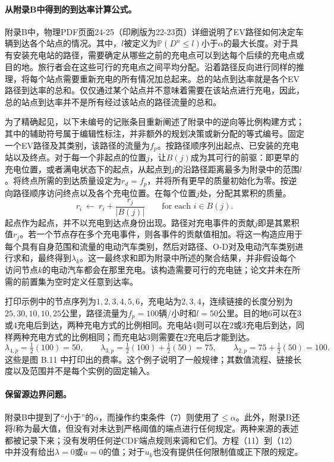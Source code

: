 \documentclass{article}
\begin{document}
\paragraph{从附录B中得到的到达率计算公式。}
附录B中，物理PDF页面24-25（印刷版为22-23页）详细说明了EV路径如何决定车辆到达各个站点的情况。其中，$l$被定义为$\mathbb P(D^n\leq l)$小于$\alpha$的最大长度。对于具有安装充电站的路径，需要确定从哪些之前的充电点可以到达每个后续的充电点或目的地。旅行者会在这些可行的充电点之间平均分配。沿着路径反向进行同样的推理，将每个站点需要重新充电的所有情况加总起来。总的站点到达率就是各个EV路径到达率的总和。仅仅通过某个站点并不意味着需要在该站点进行充电，因此，总的站点到达率并不是所有经过该站点的路径流量的总和。

为了精确起见，以下未编号的记账条目重新阐述了附录中的逆向等比例构建方式；其中的辅助符号属于编辑性标注，并非额外的规划决策或新分配的等式编号。固定一个EV路径及其类别，该路径的流量为$f_p$。按路径顺序列出起点、已安装的充电站以及终点。对于每一个非起点的位置$j$，让$B(j)$成为其可行的前驱：即更早的充电位置，或者满电状态下的起点，从起点到$j$的沿路径距离最多为附录中的范围$l$。将终点所需的到达质量设定为$r_d=f_p$，并将所有更早的质量初始化为零。按逆向路径顺序访问终点以及各个充电位置。在每个位置$j$处，分配其累积的质量。
\[
 r_i\ \leftarrow\ r_i+\frac{r_j}{|B(j)|}
 \qquad \text{for each }i\in B(j).
\]
起点作为起点，并不以充电到达点身份出现。路径对充电事件的贡献$j$即是其累积值$r_j$。若一个节点存在多个充电事件，则各事件的贡献值相加。将这一构造应用于每个具有自身范围和流量的电动汽车类别，然后对路径、O-D对及电动汽车类别进行求和，最终得到$\lambda_k$。这一最终求和即为附录中所述的聚合结果，并非假设每个访问节点$k$的电动汽车都会在那里充电。该构造需要可行的充电链；论文并未在所需的前置集为空时定义任意到达率。

打印示例中的节点序列为$1,2,3,4,5,6$，充电站为$2,3,4$，连续链接的长度分别为$25,30,10,10,25$公里，路径流量为$f_p=100$辆/小时和$l=50$公里。目的地$6$可以在$3$或$4$充电后到达，两种充电方式的比例相同。充电站$4$则可以在$2$或$3$充电后到达，同样两种充电方式的比例相同；而充电站$3$则需要在$2$充电后才能到达。
\[
\lambda_{4,p}=\tfrac12(100)=50,\qquad
\lambda_{3,p}=\tfrac12(100)+\tfrac12(50)=75,\qquad
\lambda_{2,p}=75+\tfrac12(50)=100.
\]
这些是图 B.11 中打印出的费率。这个例子说明了一般规律；其数值流程、链接长度以及范围并不是每个实例的固定输入。

\paragraph{保留源边界问题。}
附录B中提到了“小于”的$\alpha$，而操作约束条件（7）则使用了$\leq\alpha$。此外，附录B还将$l$称为最大值，但没有对未达到严格阈值的端点进行任何规定。两种来源的表述都被记录下来；没有发明任何逆CDF端点规则来调和它们。方程（11）到（12）中并没有给出$\lambda=0$或$u=0$的值；对于$u_k$也没有提供任何限制值或正下限的规定。
\end{document}
